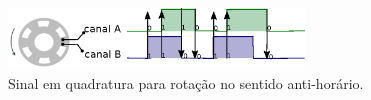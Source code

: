 \begin{figure}[H]
    \centering
    \includegraphics[width=0.7\textwidth]{imagens/ilustracoes/sinal_enquadratura_sentido_CCW.eps}
    \caption{Sinal em quadratura para rotação no sentido anti-horário.}
    \label{fig:ccw_signal}
\end{figure}

